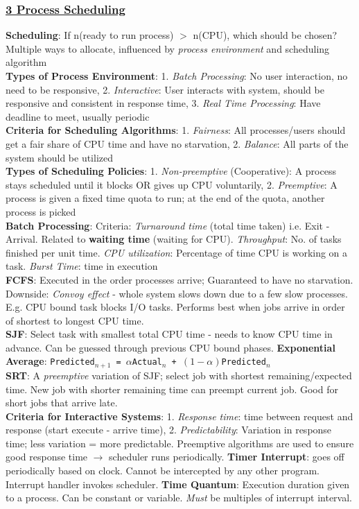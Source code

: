 \documentclass{article}
\begin{document}
\begin{multicols*}{3}
\subsubsection*{\underline{3 Process Scheduling}}
\textbf{Scheduling}: If n(ready to run process) $>$ n(CPU), which should be chosen? Multiple ways to allocate, influenced by \textit{process environment} and scheduling algorithm \\
\textbf{Types of Process Environment}: 1. \textit{Batch Processing}: No user interaction, no need to be responsive, 2. \textit{Interactive}: User interacts with system, should be responsive and consistent in response time, 3. \textit{Real Time Processing}: Have deadline to meet, usually periodic\\ 
\textbf{Criteria for Scheduling Algorithms}: 1. \textit{Fairness}: All processes/users should get a fair share of CPU time and have no starvation, 2. \textit{Balance}: All parts of the system should be utilized\\
\textbf{Types of Scheduling Policies}: 1. \textit{Non-preemptive} (Cooperative): A process stays scheduled until it blocks OR gives up CPU voluntarily, 2. \textit{Preemptive}: A process is given a fixed time quota to run; at the end of the quota, another process is picked \\
\textbf{Batch Processing}: Criteria: \textit{Turnaround time} (total time taken) i.e. Exit - Arrival. Related to \textbf{waiting time} (waiting for CPU). \textit{Throughput}: No. of tasks finished per unit time. \textit{CPU utilization}: Percentage of time CPU is working on a task. \textit{Burst Time}: time in execution \\
\textbf{FCFS}: Executed in the order processes arrive; Guaranteed to have no starvation. Downside: \textit{Convoy effect} - whole system slows down due to a few slow processes. E.g. CPU bound task blocks I/O tasks. Performs best when jobs arrive in order of shortest to longest CPU time. \\
\textbf{SJF}: Select task with smallest total CPU time - needs to know CPU time in advance. Can be guessed through previous CPU bound phases. \textbf{Exponential Average}: \texttt{Predicted$_{n+1}$ = $\alpha$Actual$_n$ + $(1-\alpha)$Predicted$_n$ } \\
\textbf{SRT}: A \textit{preemptive} variation of SJF; select job with shortest remaining/expected time. New job with shorter remaining time can preempt current job. Good for short jobs that arrive late. \\
\textbf{Criteria for Interactive Systems}: 1. \textit{Response time}: time between request and response (start execute - arrive time), 2. \textit{Predictability}: Variation in response time; less variation = more predictable. Preemptive algorithms are used to ensure good response time $\to$ scheduler runs periodically. \textbf{Timer Interrupt}: goes off periodically based on clock. Cannot be intercepted by any other program. Interrupt handler invokes scheduler. \textbf{Time Quantum}: Execution duration given to a process. Can be constant or variable. \textit{Must} be multiples of interrupt interval. \\

\end{multicols*}
\end{document}
